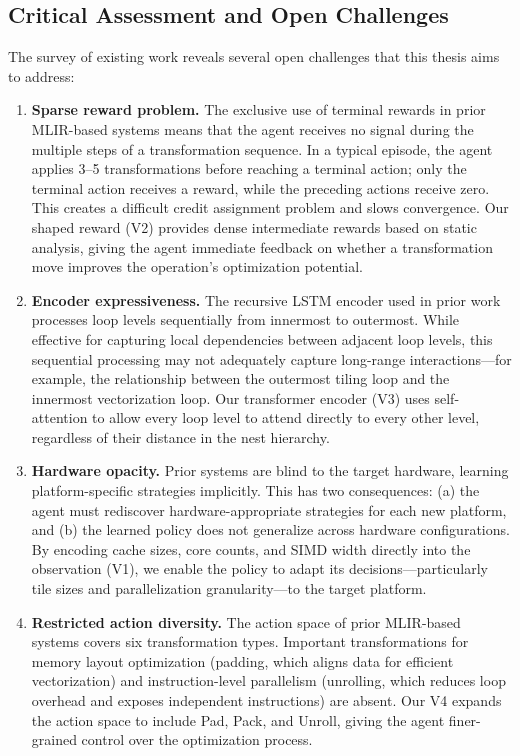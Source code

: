 \subsection{Critical Assessment and Open Challenges}

The survey of existing work reveals several open challenges that this thesis aims to address:

\begin{enumerate}
    \item \textbf{Sparse reward problem.} The exclusive use of terminal rewards in prior MLIR-based systems means that the agent receives no signal during the multiple steps of a transformation sequence. In a typical episode, the agent applies 3–5 transformations before reaching a terminal action; only the terminal action receives a reward, while the preceding actions receive zero. This creates a difficult credit assignment problem and slows convergence. Our shaped reward (V2) provides dense intermediate rewards based on static analysis, giving the agent immediate feedback on whether a transformation move improves the operation's optimization potential.

    \item \textbf{Encoder expressiveness.} The recursive LSTM encoder used in prior work processes loop levels sequentially from innermost to outermost. While effective for capturing local dependencies between adjacent loop levels, this sequential processing may not adequately capture long-range interactions—for example, the relationship between the outermost tiling loop and the innermost vectorization loop. Our transformer encoder (V3) uses self-attention to allow every loop level to attend directly to every other level, regardless of their distance in the nest hierarchy.

    \item \textbf{Hardware opacity.} Prior systems are blind to the target hardware, learning platform-specific strategies implicitly. This has two consequences: (a) the agent must rediscover hardware-appropriate strategies for each new platform, and (b) the learned policy does not generalize across hardware configurations. By encoding cache sizes, core counts, and SIMD width directly into the observation (V1), we enable the policy to adapt its decisions—particularly tile sizes and parallelization granularity—to the target platform.

    \item \textbf{Restricted action diversity.} The action space of prior MLIR-based systems covers six transformation types. Important transformations for memory layout optimization (padding, which aligns data for efficient vectorization) and instruction-level parallelism (unrolling, which reduces loop overhead and exposes independent instructions) are absent. Our V4 expands the action space to include Pad, Pack, and Unroll, giving the agent finer-grained control over the optimization process.


\end{enumerate}

